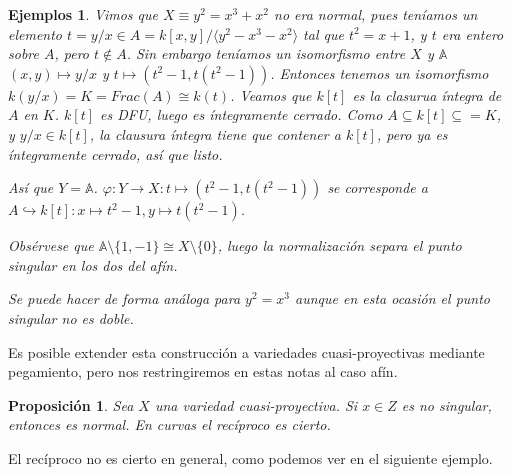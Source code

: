 \documentclass[a4paper,10pt]{book}
\newtheorem{prop}[thm]{Proposición}
\newtheorem{eje}[thm]{Ejemplos}
\begin{document}
\begin{eje}
Vimos que $X\equiv y^2=x^3+x^2$ no era normal, pues teníamos un elemento $t=y/x\in A=k[x,y]/\langle y^2-x^3-x^2\rangle$ tal que $t^2=x+1$, y $t$ era entero sobre $A$, pero $t\notin A$. Sin embargo teníamos un isomorfismo entre $X$ y $\mathbb{A}$ $(x,y)\mapsto y/x$ y $t\mapsto (t^2-1,t(t^2-1))$. Entonces tenemos un isomorfismo $k(y/x)=K=Frac(A)\cong k(t)$.  Veamos que $k[t]$ es la clasurua íntegra de $A$ en $K$. $k[t]$ es DFU, luego es íntegramente cerrado. Como $A\subseteq k[t]\subseteq =K$, y $y/x\in k[t]$, la clausura íntegra tiene que contener a $k[t]$, pero ya es íntegramente cerrado, así que listo.

Así que $Y=\mathbb{A}$. $\varphi: Y\to X: t\mapsto (t^2-1,t(t^2-1))$ se corresponde a $A\hookrightarrow k[t]: x\mapsto t^2-1, y\mapsto t(t^2-1)$. 

Obsérvese que $\mathbb{A}\setminus\{1,-1\}\cong X\setminus\{0\}$, luego la normalización separa el punto singular en los dos del afín. 

Se puede hacer de forma análoga para $y^2=x^3$ aunque en esta ocasión el punto singular no es doble.
\end{eje}

Es posible extender esta construcción a variedades cuasi-proyectivas mediante pegamiento, pero nos restringiremos en estas notas al caso afín.

\begin{prop}
Sea $X$ una variedad cuasi-proyectiva. Si $x\in Z$ es no singular, entonces es normal. En curvas el recíproco es cierto.
\end{prop}

El recíproco no es cierto en general, como podemos ver en el siguiente ejemplo.
\end{document}
